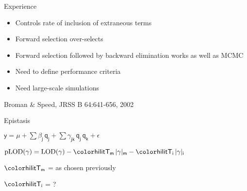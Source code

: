 \documentclass[aspectratio=169,12pt,t]{beamer}
\newcommand{\lod}{\text{LOD}}
\newcommand{\plod}{\text{pLOD}}
\begin{document}
\begin{frame}{Experience}


\hfill \begin{minipage}{10in}

\begin{itemize}
\itemsep18pt
\item Controls rate of inclusion of extraneous terms
\item Forward selection over-selects
\item {\lolit Forward selection followed by backward elimination} works as well
  as {\lolit MCMC}

\item {\hilit Need to define performance criteria}
\item {\hilit Need large-scale simulations}
\end{itemize}

\vspace{6cm}


\hfill Broman \& Speed, JRSS B 64:641-656, 2002

\end{minipage}


\end{frame}







\begin{frame}{Epistasis}


\hfill \begin{minipage}{10in}

\centerline{
$\mathsf{y  = \mu + \sum \beta_j \, q_j + \sum \gamma_{jk} \, q_j \,
    q_k + \epsilon}$
}

\vspace{3cm}

{\hilit
$\mathsf{ \plod(\gamma) = \lod(\gamma) -
    {\hilit T_m} \, |\gamma|_m - {\hilit T_i} \, |\gamma|_i }$
}


\vspace{15mm}

\hspace{3cm} $\mathsf{\hilit T_m}$ = as chosen previously

\vspace{15mm}

\hspace{3cm} $\mathsf{\hilit T_i}$ = ?



\end{minipage}

\end{frame}
\end{document}
